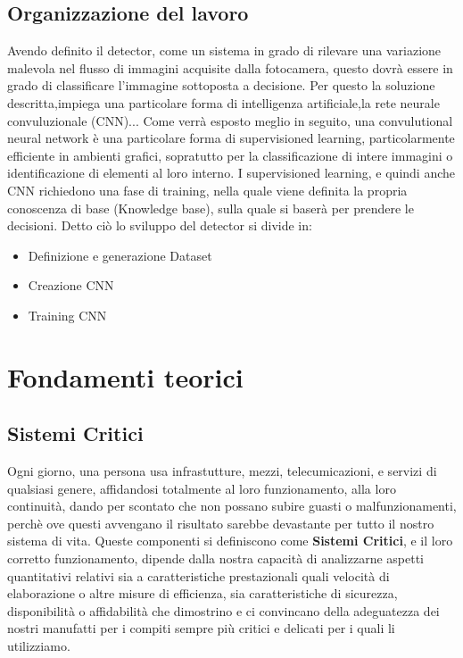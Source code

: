 \documentclass[14pt]{extarticle}
\begin{document}
\subsection{Organizzazione del lavoro} 
Avendo definito il detector, come un sistema in grado di rilevare una variazione malevola nel flusso di immagini acquisite dalla fotocamera, questo dovrà essere in grado di classificare l'immagine sottoposta a decisione. 
Per questo la soluzione descritta,impiega una particolare forma di intelligenza artificiale,la rete neurale convuluzionale (CNN)...
Come verrà esposto meglio in seguito, una convulutional neural network è una particolare forma di supervisioned learning, particolarmente efficiente in ambienti grafici, sopratutto per la classificazione di intere immagini o identificazione di elementi al loro interno. I supervisioned learning, e quindi anche CNN richiedono una fase di training, nella quale viene definita  la propria conoscenza di base (Knowledge base), sulla quale si baserà per prendere le decisioni.
Detto ciò lo sviluppo del detector si divide in:
\begin{itemize}
\item Definizione e generazione Dataset
\item Creazione CNN
\item Training CNN
\end{itemize}

\section{Fondamenti teorici}
\subsection{Sistemi Critici}
Ogni giorno, una persona usa infrastutture, mezzi, telecumicazioni, e servizi di qualsiasi genere, affidandosi totalmente al loro funzionamento, alla loro continuità, dando per scontato che non possano subire guasti o malfunzionamenti, perchè ove questi avvengano il risultato sarebbe devastante per tutto il nostro sistema di vita. Queste componenti si definiscono come \textbf{Sistemi Critici}, e  il loro corretto funzionamento, dipende dalla nostra capacità di analizzarne aspetti quantitativi relativi sia a caratteristiche prestazionali quali velocità di elaborazione o altre misure di efficienza,
sia caratteristiche di sicurezza, disponibilità o affidabilità che dimostrino e ci
convincano della adeguatezza dei nostri manufatti per i compiti sempre più
critici e delicati per i quali li utilizziamo.
\end{document}
